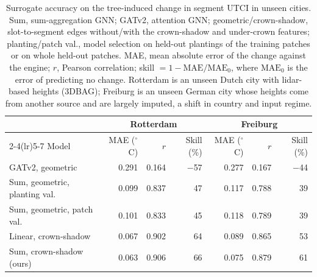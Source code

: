 \begin{table}[tbp]
\centering
\small
\setlength{\tabcolsep}{5pt}
\caption{Surrogate accuracy on the tree-induced change in segment UTCI in unseen cities. Sum, sum-aggregation GNN; GATv2, attention GNN; geometric/crown-shadow, slot-to-segment edges without/with the crown-shadow and under-crown features; planting/patch val., model selection on held-out plantings of the training patches or on whole held-out patches. MAE, mean absolute error of the change against the engine; $r$, Pearson correlation; skill $= 1 - \mathrm{MAE}/\mathrm{MAE}_0$, where $\mathrm{MAE}_0$ is the error of predicting no change. Rotterdam is an unseen Dutch city with lidar-based heights (3DBAG); Freiburg is an unseen German city whose heights come from another source and are largely imputed, a shift in country and input regime.}
\label{tab:T3_surrogates}
\begin{tabular}{lrrrrrr}
\toprule
 & \multicolumn{3}{c}{Rotterdam} & \multicolumn{3}{c}{Freiburg} \\
\cmidrule(lr){2-4}\cmidrule(lr){5-7}
Model & MAE ($^\circ$C) & $r$ & Skill (\%) & MAE ($^\circ$C) & $r$ & Skill (\%) \\
\midrule
GATv2, geometric & 0.291 & 0.164 & $-$57 & 0.277 & 0.167 & $-$44 \\
Sum, geometric, planting val. & 0.099 & 0.837 & 47 & 0.117 & 0.788 & 39 \\
Sum, geometric, patch val. & 0.101 & 0.833 & 45 & 0.118 & 0.789 & 39 \\
Linear, crown-shadow & 0.067 & 0.902 & 64 & 0.089 & 0.865 & 53 \\
Sum, crown-shadow (ours) & 0.063 & 0.906 & 66 & 0.075 & 0.879 & 61 \\
\bottomrule
\end{tabular}
\end{table}
